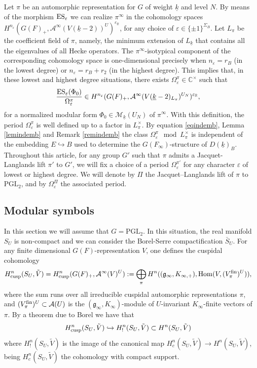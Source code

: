 \documentclass{amsart}
\theoremstyle{definition}
\theoremstyle{remark}
\numberwithin{equation}{section}
\newcommand{\PGL}{{\mathrm{PGL}}}
\newcommand{\C}{{\mathbb C}}
\newcommand{\R}{{\mathbb R}}
\newcommand{\cA}{{\mathcal A}}
\newcommand{\cM}{{\mathcal M}}
\newcommand{\mfg}{{\mathfrak g}}
\newcommand{\Hom}{{\mathrm {Hom}}}
\begin{document}
Let $\pi$ be an automorphic representation for $G$ of weight $\underline k$ and level $N$. By means of the morphism ${\rm ES}_\varepsilon$ we can realize $\pi^\infty$ in the cohomology spaces $H^{n_\varepsilon}(G(F)_+,\cA^{\infty}(V(\underline k-2))^{U})^{\varepsilon_\R}$, for any choice of $\varepsilon\in\{\pm 1\}^{\Sigma_B}$.
Let $L_\pi$ be the coefficient field of $\pi$, namely, the minimum extension of $L_{\underline k}$ that contains all the eigenvalues of all Hecke operators.  The $\pi^\infty$-isotypical component of the corresponding cohomology space is one-dimensional precisely when $n_\varepsilon=r_B$ (in the lowest degree) or $n_\varepsilon=r_B+r_2$ (in the highest degree). This implies that, in these lowest and highest degree situations, there exists $\Omega^\pi_\varepsilon\in\C^\times$ such that
\[
\frac{{\rm ES}_\varepsilon(\Phi_0)}{\Omega^\pi_\varepsilon}\in H^{n_\varepsilon}(G(F)_+,\cA^{\infty}(V(\underline k-2)_{L_\pi})^{U_N})^{\varepsilon_\R},
\]
for a normalized modular form $\Phi_0\in \cM_{\underline k}(U_N)$ of $\pi^\infty$.
With this definition, the period $\Omega^\pi_\varepsilon$ is well defined up to a factor in $L_\pi^\times$. By equation \eqref{eqindemb}, Lemma \ref{lemindemb} and Remark \ref{remindemb} the class $\Omega^\pi_\varepsilon\mod L_\pi^\times$ is independent of the embedding   $E\hookrightarrow B$ used to determine the $G(F_\infty)$-structure of $D(\underline k)_B$. Throughout this article, for any group $G'$ such that $\pi$ admits a Jacquet-Langlands lift $\pi'$ to $G'$, we will fix a choice of a period $\Omega_\varepsilon^{\pi'}$ for any character $\varepsilon$ of lowest or highest degree. We will denote by  $\Pi$ the Jacquet--Langlands lift of $\pi$ to $\PGL_2$, and by  $\Omega_\varepsilon^\Pi$ the associated period.



\subsection{Modular symbols}

In this section we will assume that $G=\PGL_2$. In this situation, the real manifold $S_U$ is non-compact and we can consider the Borel-Serre compactification $\bar S_U$. For any finite dimensional $G(F)$-representation $V$, one defines the cuspidal cohomology
\[
H^n_{\rm cusp}(S_U,\tilde V)=H^{n}_{\rm cusp}(G(F)_+,\cA^\infty(V)^U):=\bigoplus_{\pi}H^{n}((\mfg_\infty,K_{\infty,+}),\Hom(V,(V_\pi^{\rm fin})^U)),
\]
where the sum runs over all irreducible cuspidal automorphic representations $\pi$, and $(V_\pi^{\rm fin})^U\subset \cA(U)$ is the $(\mfg_\infty,K_\infty)$-module of $U$-invariant $K_\infty$-finite vectors of $\pi$.
By a theorem due to Borel we have that
\[
H^n_{\rm cusp}(S_U,\tilde V)\hookrightarrow H^n_!(S_U,\tilde V)\subset H^n(S_U,\tilde V)
\]
where $H^n_!(S_U,\tilde V)$ is the image of the canonical map $H^n_c(S_U,\tilde V)\rightarrow H^n(S_U,\tilde V)$, being $H^n_c(S_U,\tilde V)$ the cohomology with compact support.
\end{document}
